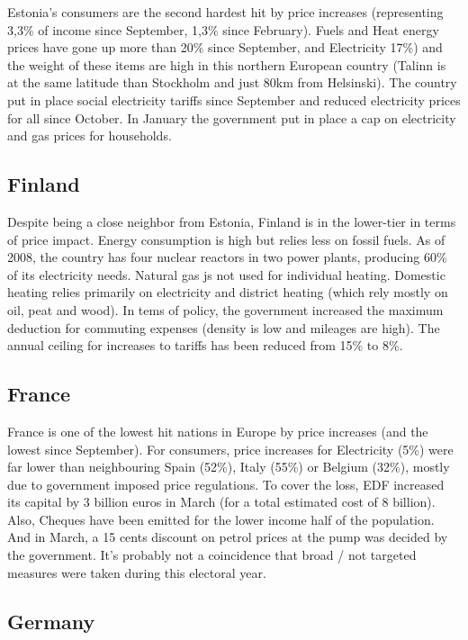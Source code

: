 \documentclass[
  9pt,
  a4paper,
  numbers=noendperiod,
  DIV=12]{scrartcl}
\begin{document}
Estonia's consumers are the second hardest hit by price increases
(representing 3,3\% of income since September, 1,3\% since February).
Fuels and Heat energy prices have gone up more than 20\% since
September, and Electricity 17\%) and the weight of these items are high
in this northern European country (Talinn is at the same latitude than
Stockholm and just 80km from Helsinski). The country put in place social
electricity tariffs since September and reduced electricity prices for
all since October. In January the government put in place a cap on
electricity and gas prices for households.

\hypertarget{finland}{%
\subsection{Finland}\label{finland}}

Despite being a close neighbor from Estonia, Finland is in the
lower-tier in terms of price impact. Energy consumption is high but
relies less on fossil fuels. As of 2008, the country has four nuclear
reactors in two power plants, producing 60\% of its electricity needs.
Natural gas js not used for individual heating. Domestic heating relies
primarily on electricity and district heating (which rely mostly on oil,
peat and wood). In tems of policy, the government increased the maximum
deduction for commuting expenses (density is low and mileages are high).
The annual ceiling for increases to tariffs has been reduced from 15\%
to 8\%.

\hypertarget{france}{%
\subsection{France}\label{france}}

France is one of the lowest hit nations in Europe by price increases
(and the lowest since September). For consumers, price increases for
Electricity (5\%) were far lower than neighbouring Spain (52\%), Italy
(55\%) or Belgium (32\%), mostly due to government imposed price
regulations. To cover the loss, EDF increased its capital by 3 billion
euros in March (for a total estimated cost of 8 billion). Also, Cheques
have been emitted for the lower income half of the population. And in
March, a 15 cents discount on petrol prices at the pump was decided by
the government. It's probably not a coincidence that broad / not
targeted measures were taken during this electoral year.

\hypertarget{germany}{%
\subsection{Germany}\label{germany}}
\end{document}

